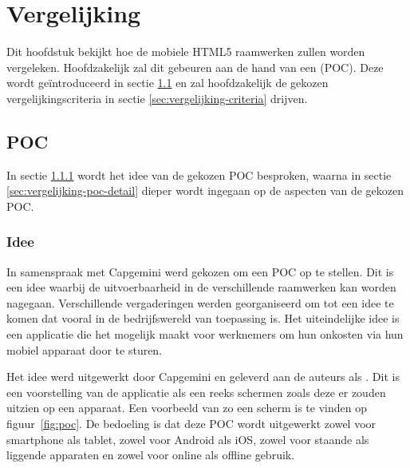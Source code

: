\chapter{Vergelijking}
\label{chap:vergelijking}

Dit hoofdstuk bekijkt hoe de mobiele HTML5 raamwerken zullen worden vergeleken.
Hoofdzakelijk zal dit gebeuren aan de hand van een  (POC).
Deze wordt geïntroduceerd in sectie \ref{sec:vergelijking-poc} en zal hoofdzakelijk de gekozen vergelijkingscriteria in sectie \ref{sec:vergelijking-criteria} drijven.


\section{POC} %
\label{sec:vergelijking-poc}
In sectie \ref{sec:vergelijking-poc-idee} wordt het idee van de gekozen POC besproken, waarna in sectie \ref{sec:vergelijking-poc-detail} dieper wordt ingegaan op de aspecten van de gekozen POC.

\subsection{Idee}
\label{sec:vergelijking-poc-idee}

In samenspraak met Capgemini werd gekozen om een POC op te stellen.
Dit is een idee waarbij de uitvoerbaarheid in de verschillende raamwerken kan worden nagegaan.
Verschillende vergaderingen werden georganiseerd om tot een idee te komen dat vooral in de bedrijfswereld van toepassing is.
Het uiteindelijke idee is een applicatie die het mogelijk maakt voor werknemers om hun onkosten via hun mobiel apparaat door te sturen.

Het idee werd uitgewerkt door Capgemini en geleverd aan de auteurs als .
Dit is een voorstelling van de applicatie als een reeks schermen zoals deze er zouden uitzien op een apparaat. 
Een voorbeeld van zo een scherm is te vinden op figuur~\ref{fig:poc}. 
De bedoeling is dat deze POC wordt uitgewerkt zowel voor smartphone als tablet, zowel voor Android als iOS, zowel voor staande als liggende apparaten en zowel voor online als offline gebruik.

